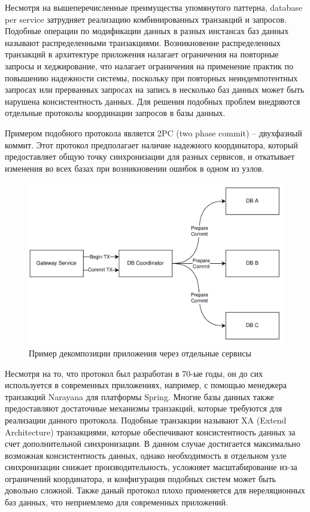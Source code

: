 Несмотря на вышеперечисленные преимущества упомянутого паттерна, database per service затрудняет реализацию комбинированных транзакций и запросов. 
Подобные операции по модификации данных в разных инстансах баз данных называют распределенными транзакциями.
Возникновение распределенных транзакций в архитектуре приложения налагает ограничения на повторные запросы и хеджирование, что налагает
ограничения на применение практик по повышению надежности системы, поскольку при повторных неиндемпотентных запросах или прерванных запросах на запись в несколько баз данных
может быть нарушена консистентность данных.
Для решения подобных проблем внедряются отдельные протоколы координации запросов в базы данных.

Примером подобного протокола является 2PC (two phase commit) -- двухфазный коммит. Этот протокол предполагает
наличие надежного координатора, который предоставляет общую точку синхронизации для разных сервисов, и откатывает изменения
во всех базах при возникновении ошибок в одном из узлов.
\begin{figure}[H]
    \centering
    \includegraphics[width=0.8\linewidth]{img/2pc.png}
    \caption{Пример декомпозиции приложения через отдельные сервисы}
    \label{fig:y}
\end{figure}

Несмотря на то, что протокол был разработан в 70-ые годы, он до сих используется в современных приложениях, например,
с помощью менеджера транзакций Narayana для платформы Spring. Многие базы данных также предоставляют достаточные механизмы транзакций, которые
требуются для реализации данного протокола. Подобные транзакции называют XA (Extend Architecture) транзакциями, которые обеспечивают
консистентность данных за счет дополнительной синхронизации.
В данном случае достигается максимально возможная консистентность данных, однако
необходимость в отдельном узле синхронизации снижает производительность, усложняет масштабирование из-за ограничений координатора, и конфигурация подобных систем
может быть довольно сложной.
Также даный протокол плохо применяется
для нереляционных баз данных, что неприемлемо для современных приложений.

